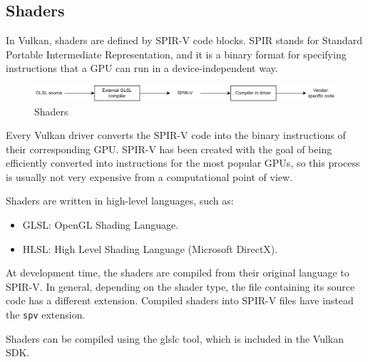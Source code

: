 \subsection{Shaders}
In Vulkan, shaders are defined by SPIR-V code blocks. 
SPIR stands for Standard Portable Intermediate Representation, and it is a binary format for specifying instructions that a GPU can run in a device-independent way.
\begin{figure}[H]
    \centering
    \includegraphics[width=1\linewidth]{images/shaders.png}
    \caption{Shaders}
\end{figure}
Every Vulkan driver converts the SPIR-V code into the binary instructions of their corresponding GPU.\@ 
SPIR-V has been created with the goal of being efficiently converted into instructions for the most popular GPUs, so this process is usually not very expensive from a computational point of view.

Shaders are written in high-level languages, such as:
\begin{itemize}
    \item GLSL\@: OpenGL Shading Language.
    \item HLSL\@: High Level Shading Language (Microsoft DirectX).
\end{itemize}
At development time, the shaders are compiled from their original language to SPIR-V. 
In general, depending on the shader type, the file containing its source code has a different extension. 
Compiled shaders into SPIR-V files have instead the \texttt{spv} extension.

Shaders can be compiled using the glslc tool, which is included in the Vulkan SDK.\@